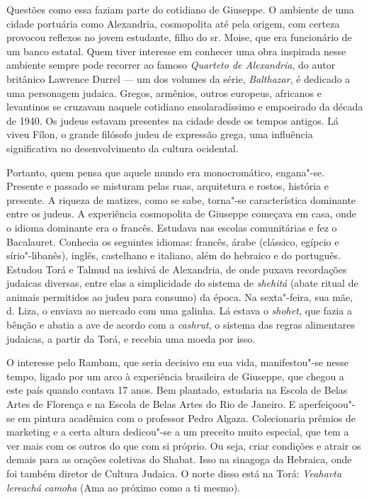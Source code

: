 \asterisc

Questões como essa faziam parte do cotidiano de Giuseppe. O ambiente de
uma cidade portuária como Alexandria, cosmopolita até pela origem, com
certeza provocou reflexos no jovem estudante, filho do sr. Moise, que
era funcionário de um banco estatal. Quem tiver interesse em conhecer
uma obra inspirada nesse ambiente sempre pode recorrer ao famoso
\emph{Quarteto de Alexandria}, do autor britânico Lawrence Durrel --- um
dos volumes da série, \emph{Balthazar}, é dedicado a uma personagem
judaica. Gregos, armênios, outros europeus, africanos e levantinos se
cruzavam naquele cotidiano ensolaradíssimo e empoeirado da década de
1940. Os judeus estavam presentes na cidade desde os tempos antigos. Lá
viveu Fílon, o grande filósofo judeu de expressão grega, uma influência
significativa no desenvolvimento da cultura ocidental.

Portanto, quem pensa que aquele mundo era monocromático, engana"-se.
Presente e passado se misturam pelas ruas, arquitetura e rostos,
história e presente. A riqueza de matizes, como se sabe, torna"-se
característica dominante entre os judeus. A experiência cosmopolita de
Giuseppe começava em casa, onde o idioma dominante era o francês.
Estudava nas escolas comunitárias e fez o Bacalauret. Conhecia os
seguintes idiomas: francês, árabe (clássico, egípcio e sírio"-libanês),
inglês, castelhano e italiano, além do hebraico e do português. Estudou
Torá e Talmud na ieshivá de Alexandria, de onde puxava recordações
judaicas diversas, entre elas a simplicidade do sistema de
\emph{shehitá} (abate ritual de animais permitidos ao judeu para
consumo) da época. Na sexta"-feira, sua mãe, d. Liza, o enviava ao
mercado com uma galinha. Lá estava o \emph{shohet,} que fazia a bênção e
abatia a ave de acordo com a \emph{cashrut}, o sistema das regras
alimentares judaicas, a partir da Torá, e recebia uma moeda por isso.

O interesse pelo Rambam, que seria decisivo em sua vida, manifestou"-se
nesse tempo, ligado por um arco à experiência brasileira de Giuseppe,
que chegou a este país quando contava 17 anos. Bem plantado, estudaria
na Escola de Belas Artes de Florença e na Escola de Belas Artes do Rio
de Janeiro. E aperfeiçoou"-se em pintura acadêmica com o professor Pedro
Algaza. Colecionaria prêmios de marketing e a certa altura dedicou"-se a
um preceito muito especial, que tem a ver mais com os outros do que com si
próprio. Ou seja, criar condições e atrair os demais para as
orações coletivas do Shabat. Isso na sinagoga da Hebraica, onde foi
também diretor de Cultura Judaica. O norte disso está na Torá:
\emph{Veahavta lereachá} \emph{camoha} (Ama ao próximo como a ti mesmo).


